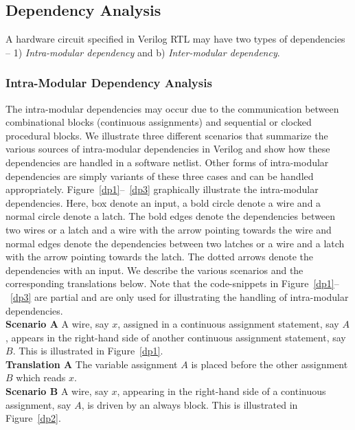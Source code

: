 %
\subsection{Dependency Analysis}
%
A hardware circuit specified in Verilog RTL may have two types of dependencies -- 
1) \emph{Intra-modular dependency} and b) \emph{Inter-modular dependency}. 
%
\subsubsection{Intra-Modular Dependency Analysis}
%
The intra-modular dependencies may occur due to the communication between
combinational blocks (continuous assignments) and sequential or clocked 
procedural blocks.  We illustrate three different scenarios that summarize 
the various sources of intra-modular dependencies in Verilog and show 
how these dependencies are handled in a software netlist.  Other forms of 
intra-modular dependencies are simply variants of these three cases 
and can be handled appropriately.
%
Figure~\ref{dp1}--~\ref{dp3} graphically illustrate the intra-modular dependencies.  
%
Here, box denote an input, a bold circle denote a wire and a normal circle
denote a latch.  The bold edges denote the dependencies between two wires or a latch 
and a wire with the arrow pointing towards the wire and normal edges denote the 
dependencies between two latches or a wire and a latch with the arrow pointing
towards the latch. The dotted arrows denote the dependencies with an input. 
%
We describe the various scenarios and the corresponding translations below. 
Note that the code-snippets in Figure~\ref{dp1}--~\ref{dp3} are partial 
and are only used for illustrating the handling of intra-modular dependencies.
\\
%
\noindent \textbf{Scenario A}  A wire, say $x$,  assigned in a continuous assignment 
statement, say $A$, appears in the right-hand side of another continuous assignment 
statement, say $B$.  This is illustrated in Figure~\ref{dp1}.\\

\noindent \textbf{Translation A} The variable assignment $A$ is placed before the other assignment $B$ 
which reads $x$.  \\

\noindent \textbf{Scenario B} A wire, say $x$, appearing in the right-hand side of a 
continuous assignment, say $A$, is driven by an always block.  This is illustrated in 
Figure~\ref{dp2}.\\

